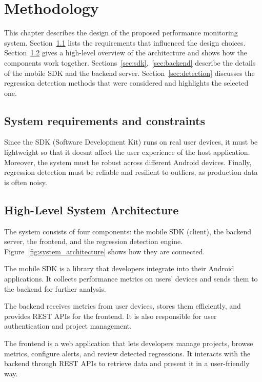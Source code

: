 \chapter{Methodology}
\label{chap:met}

This chapter describes the design of the proposed performance monitoring system. Section~\ref{sec:req} lists the requirements that influenced the design choices. Section~\ref{sec:arch} gives a high-level overview of the architecture and shows how the components work together. Sections~\ref{sec:sdk},~\ref{sec:backend} describe the details of the mobile SDK and the backend server. Section~\ref{sec:detection} discusses the regression detection methods that were considered and highlights the selected one.

\section{System requirements and constraints}
\label{sec:req}

Since the SDK (Software Development Kit) runs on real user devices, it must be lightweight so that it doesnt affect the user experience of the host application. Moreover, the system must be robust across different Android devices. Finally, regression detection must be reliable and resilient to outliers, as production data is often noisy.

\section{High-Level System Architecture}
\label{sec:arch}

The system consists of four components: the mobile SDK (client), the backend server, the frontend, and the regression detection engine. Figure~\ref{fig:system_architecture} shows how they are connected.

The mobile SDK is a library that developers integrate into their Android applications. It collects performance metrics on users' devices and sends them to the backend for further analysis.

The backend receives metrics from user devices, stores them efficiently, and provides REST APIs for the frontend. It is also responsible for user authentication and project management.

The frontend is a web application that lets developers manage projects, browse metrics, configure alerts, and review detected regressions. It interacts with the backend through REST APIs to retrieve data and present it in a user-friendly way.


